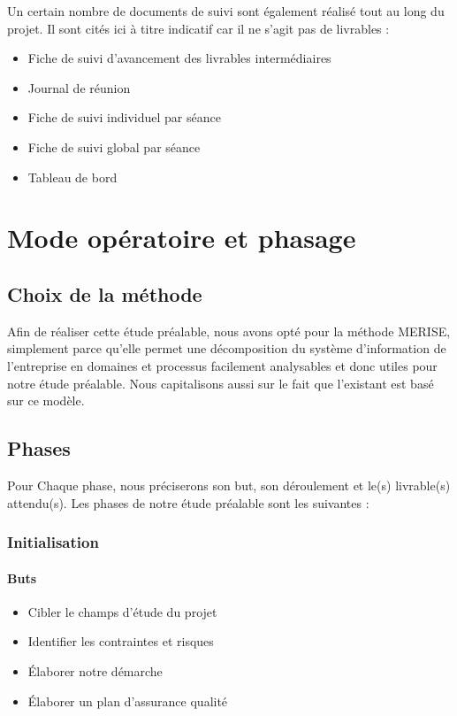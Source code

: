Un certain nombre de documents de suivi sont également réalisé tout au long du projet. Il sont cités ici à titre indicatif car il ne s’agit pas de livrables :
\begin{itemize}
    \item Fiche de suivi d’avancement des livrables intermédiaires
    \item Journal de réunion
    \item Fiche de suivi individuel par séance
    \item Fiche de suivi global par séance
    \item Tableau de bord
\end{itemize}

\section{Mode opératoire et phasage}

\subsection{Choix de la méthode}

Afin de réaliser cette étude préalable, nous avons opté pour la méthode MERISE, simplement parce qu'elle permet une décomposition du système d'information de l'entreprise en domaines et processus facilement analysables et donc utiles pour notre étude préalable. Nous capitalisons aussi sur le fait que l’existant est basé sur ce modèle.

\subsection{Phases}

Pour Chaque phase, nous préciserons son but, son déroulement et le(s) livrable(s) attendu(s). Les phases de notre étude préalable sont les suivantes :

\subsubsection{Initialisation}

\paragraph{Buts}
\begin{itemize}
    \item Cibler le champs d’étude du projet
    \item Identifier les contraintes et risques
    \item Élaborer notre démarche
    \item Élaborer un plan d’assurance qualité
\end{itemize}


